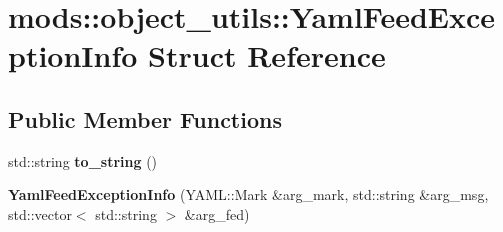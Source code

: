 \hypertarget{structmods_1_1object__utils_1_1YamlFeedExceptionInfo}{}\section{mods\+:\+:object\+\_\+utils\+:\+:Yaml\+Feed\+Exception\+Info Struct Reference}
\label{structmods_1_1object__utils_1_1YamlFeedExceptionInfo}
\subsection*{Public Member Functions}
\begin{DoxyCompactItemize}
\item 
\mbox{\label{structmods_1_1object__utils_1_1YamlFeedExceptionInfo_a9a525257bf2c259b52d421916e274bfe}} 
std\+::string {\bfseries to\+\_\+string} ()
\item 
\mbox{\label{structmods_1_1object__utils_1_1YamlFeedExceptionInfo_aede29b73361f47ff618106692a6d983f}} 
{\bfseries Yaml\+Feed\+Exception\+Info} (Y\+A\+M\+L\+::\+Mark \&arg\+\_\+mark, std\+::string \&arg\+\_\+msg, std\+::vector$<$ std\+::string $>$ \&arg\+\_\+fed)
\end{DoxyCompactItemize}
